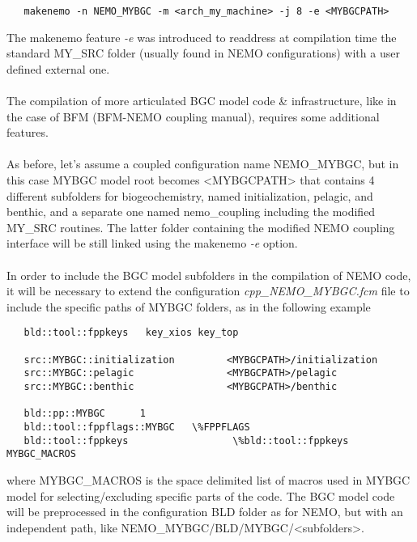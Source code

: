 \documentclass[../main/TOP_manual]{subfiles}
\begin{document}
\begin{verbatim}
   makenemo -n NEMO_MYBGC -m <arch_my_machine> -j 8 -e <MYBGCPATH>
\end{verbatim}

The makenemo feature \textit{-e} was introduced to readdress at compilation time the standard MY\_SRC folder (usually found in NEMO configurations) with a user defined external one. \\ \\

The compilation of more articulated BGC model code \& infrastructure, like in the case of BFM (BFM-NEMO coupling manual), requires some additional features. \\ \\

As before, let's assume a coupled configuration name NEMO\_MYBGC, but in this case MYBGC model root becomes <MYBGCPATH> that contains 4 different subfolders for biogeochemistry, named initialization, pelagic, and benthic, and a separate one named nemo\_coupling including the modified MY\_SRC routines. The latter folder containing the modified NEMO coupling interface will be still linked using the makenemo \textit{-e} option. \\ \\

In order to include the BGC model subfolders in the compilation of NEMO code, it will be necessary to extend the configuration \textit{cpp\_NEMO\_MYBGC.fcm} file to include the specific paths of MYBGC folders, as in the following example

\begin{verbatim}
   bld::tool::fppkeys   key_xios key_top

   src::MYBGC::initialization         <MYBGCPATH>/initialization
   src::MYBGC::pelagic                <MYBGCPATH>/pelagic
   src::MYBGC::benthic                <MYBGCPATH>/benthic

   bld::pp::MYBGC      1
   bld::tool::fppflags::MYBGC   \%FPPFLAGS
   bld::tool::fppkeys                  \%bld::tool::fppkeys MYBGC_MACROS
\end{verbatim}

where MYBGC\_MACROS is the space delimited list of macros used in MYBGC model for selecting/excluding specific parts of the code. The BGC model code will be preprocessed in the configuration BLD folder as for NEMO, but with an independent path, like NEMO\_MYBGC/BLD/MYBGC/<subfolders>.\\
\end{document}
